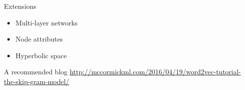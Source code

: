 \documentclass{beamer}
\begin{document}
	\begin{frame}{Extensions}
		\begin{itemize}
			\item Multi-layer networks
			\item Node attributes
			\item Hyperbolic space
		\end{itemize}
	\end{frame}
	
	\begin{frame}{A recommended blog}
		\url{http://mccormickml.com/2016/04/19/word2vec-tutorial-the-skip-gram-model/}
	\end{frame}
\end{document}
